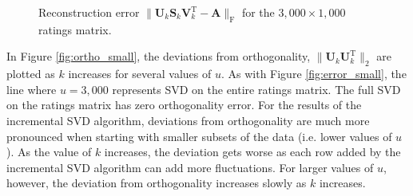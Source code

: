 \documentclass{article} %
\newcommand{\A}{\mathbf{A}}
\newcommand{\T}{\textrm{T}}
\begin{document}
\begin{figure}[H]
\begin{center}
\end{center}
\caption{Reconstruction error
$\|\mathbf{U}_k\mathbf{S}_k\mathbf{V}_k^{\T} - \A\|_{\textrm{F}}$ for
the $3,000 \times 1,000$ ratings matrix.}
\label{fig:recon_small}
\end{figure}

\newpage

In Figure \ref{fig:ortho_small}, the deviations from orthogonality, 
$\|\mathbf{U}_k\mathbf{U}_k^{\T}\|_2$ are plotted as $k$ increases for several values of $u$.
As with Figure \ref{fig:error_small}, the line where $u = 3,000$ represents SVD on the entire ratings matrix.
The full SVD on the ratings matrix has zero orthogonality error.
For the results of the incremental SVD algorithm, deviations from orthogonality are much more pronounced when starting with smaller subsets of the data (i.e. lower values of $u$).
As the value of $k$ increases, the deviation gets worse as each row added by the incremental SVD algorithm can add more fluctuations.
For larger values of $u$, however, the deviation from orthogonality increases slowly as $k$ increases.
\end{document}
